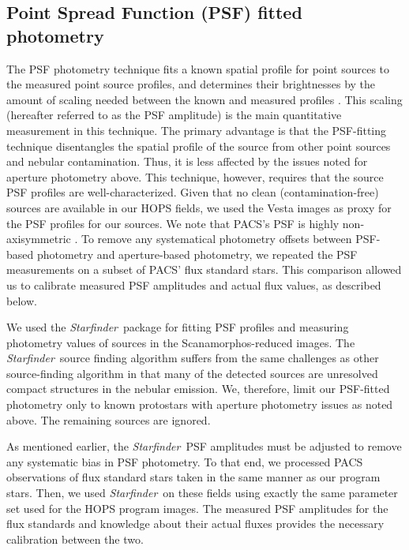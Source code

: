 \documentclass[manuscript]{aastex}
\newcommand{\starfinder}{{\em Starfinder}}
\begin{document}
\subsection{Point Spread Function (PSF) fitted photometry}
\par
The PSF photometry technique fits a known spatial profile for point sources to the measured point source profiles, and determines their brightnesses by the amount of scaling needed between the known and measured profiles \citep{psfphotometry}.   This scaling (hereafter referred to as the PSF amplitude) is the main quantitative measurement in this technique.  The primary advantage is that the PSF-fitting technique disentangles the spatial profile of the source from other point sources and nebular contamination.  Thus, it is less affected by the issues noted for aperture photometry above.  This technique, however, requires that the source PSF profiles are well-characterized.  Given that no clean (contamination-free) sources are available in our HOPS fields, we used the Vesta images \citep{psfpaper} as proxy for the PSF profiles for our sources.  We note that PACS's PSF is highly non-axisymmetric \citep{psfpaper}.  To remove any systematical photometry offsets between PSF-based photometry and aperture-based photometry, we repeated the PSF measurements on a subset of PACS' flux standard stars.  This comparison allowed us to calibrate measured PSF amplitudes and actual flux values, as described below.
\par
We used the \starfinder\ package \citep{starfinder} for fitting PSF profiles  and measuring photometry values of sources in the Scanamorphos-reduced images.  The \starfinder\ source finding algorithm suffers from the same challenges as other source-finding algorithm in that many of the detected sources are unresolved compact structures in the nebular emission.  We, therefore, limit our PSF-fitted photometry only to known protostars with aperture photometry issues as noted above.  The remaining sources are ignored.
\par
As mentioned earlier, the \starfinder\ PSF amplitudes must be adjusted to remove any systematic bias in PSF photometry.  To that end, we processed PACS observations of flux standard stars taken in the same manner as our program stars.  Then, we used \starfinder\ on these fields using exactly the same parameter set used for the HOPS program images.  The measured PSF amplitudes for the flux standards and knowledge about their actual fluxes provides the necessary calibration between the two.
\end{document}
